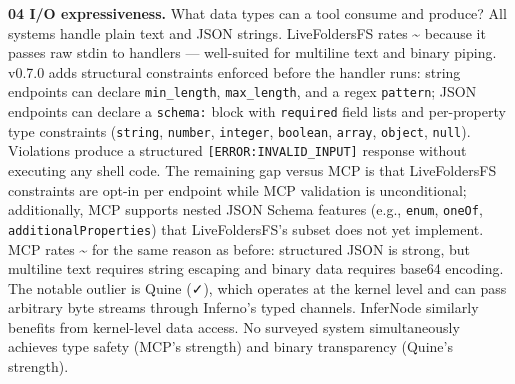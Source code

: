 \documentclass[
  11pt,
]{article}
\begin{document}
\textbf{04 I/O expressiveness.} What data types can a tool consume and
produce? All systems handle plain text and JSON strings. LiveFoldersFS
rates \textasciitilde{} because it passes raw stdin to handlers ---
well-suited for multiline text and binary piping. v0.7.0 adds structural
constraints enforced before the handler runs: string endpoints can
declare \texttt{min\_length}, \texttt{max\_length}, and a regex
\texttt{pattern}; JSON endpoints can declare a \texttt{schema:} block
with \texttt{required} field lists and per-property type constraints
(\texttt{string}, \texttt{number}, \texttt{integer}, \texttt{boolean},
\texttt{array}, \texttt{object}, \texttt{null}). Violations produce a
structured \texttt{{[}ERROR:INVALID\_INPUT{]}} response without
executing any shell code. The remaining gap versus MCP is that
LiveFoldersFS constraints are opt-in per endpoint while MCP validation
is unconditional; additionally, MCP supports nested JSON Schema features
(e.g., \texttt{enum}, \texttt{oneOf}, \texttt{additionalProperties})
that LiveFoldersFS's subset does not yet implement. MCP rates
\textasciitilde{} for the same reason as before: structured JSON is
strong, but multiline text requires string escaping and binary data
requires base64 encoding. The notable outlier is Quine (✓), which
operates at the kernel level and can pass arbitrary byte streams through
Inferno's typed channels. InferNode similarly benefits from kernel-level
data access. No surveyed system simultaneously achieves type safety
(MCP's strength) and binary transparency (Quine's strength).
\end{document}
